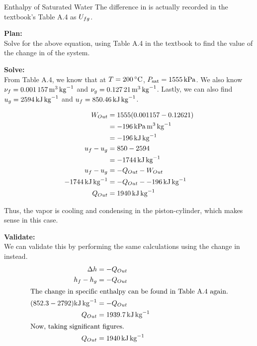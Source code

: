 \begin{example}{Enthalpy of Saturated Water}
  The difference in  is actually recorded in the textbook's Table A.4 as $U_{fg}$.

  \textbf{Plan:} \\
  Solve for the above equation, using Table A.4 in the textbook to find the value of the change in  of the system.

  \textbf{Solve:} \\
  From Table A.4, we know that at $\Temp = \SI{200}{\degreeCelsius}$, $P_{\mathrm{sat}} = \SI{1555}{\kilo\pascal}$.
  We also know $\nu_{f} = \SI{0.001157}{\meter\cubed\per\kilo\gram}$ and $\nu_{g} = \SI{0.12721}{\meter\cubed\per\kilo\gram}$.
  Lastly, we can also find $u_{g} = \SI{2594}{\kilo\joule\per\kilo\gram}$ and $u_{f} = \SI{850.46}{\kilo\joule\per\kilo\gram}$.

  \begin{align*}
    W_{Out} &= 1555 (0.001157 - 0.12621) \\
                &= \SI{-196}{\kilo\pascal\meter\cubed\per\kilo\gram} \\
                &= \SI{-196}{\kilo\joule\per\kilo\gram} \\
    u_{f} - u_{g} &= 850 - 2594 \\
                &= \SI{-1744}{\kilo\joule\per\kilo\gram} \\
    u_{f} - u_{g} &= -Q_{Out} - W_{Out} \\
    \SI{-1744}{\kilo\joule\per\kilo\gram} &= -Q_{Out} - \SI{-196}{\kilo\joule\per\kilo\gram} \\
    Q_{Out} &= \SI{1940}{\kilo\joule\per\kilo\gram}
  \end{align*}

  Thus, the vapor is cooling and condensing in the piston-cylinder, which makes sense in this case.

  \textbf{Validate:} \\
  We can validate this by performing the same calculations using the change in  instead.
  \begin{align*}
    \Delta h &= -Q_{Out} \\
    h_{f} - h_{g} &= -Q_{Out} \\
    \intertext{The change in specific enthalpy can be found in Table A.4 again.}
    (852.3 - 2792) \si{\kilo\joule\per\kilo\gram} &= -Q_{Out} \\
    Q_{Out} &= \SI{1939.7}{\kilo\joule\per\kilo\gram} \\
    \shortintertext{Now, taking significant figures.}
    Q_{Out} &= \SI{1940}{\kilo\joule\per\kilo\gram}
  \end{align*}


\end{example}
